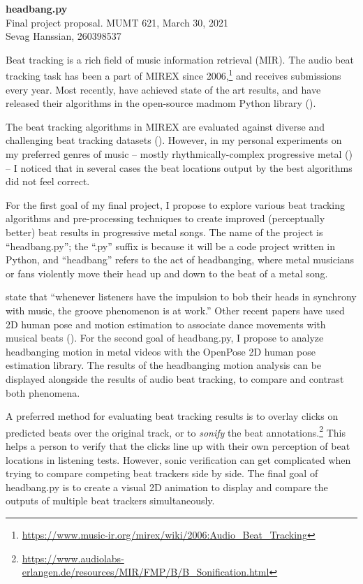 \documentclass[letter,12pt]{report}
\begin{document}
\noindent\Large{\textbf{headbang.py}}\\
\large{Final project proposal. MUMT 621, March 30, 2021}\\
\large{Sevag Hanssian, 260398537}

\noindent\hrulefill

\vspace{2em}

Beat tracking is a rich field of music information retrieval (MIR). The audio beat tracking task has been a part of MIREX since 2006,\footnote{\url{https://www.music-ir.org/mirex/wiki/2006:Audio_Beat_Tracking}} and receives submissions every year. Most recently, \textcite{bock1, bock2} have achieved state of the art results, and have released their algorithms in the open-source madmom Python library (\cite{madmom}).

The beat tracking algorithms in MIREX are evaluated against diverse and challenging beat tracking datasets (\cite{beatmeta}). However, in my personal experiments on my preferred genres of music -- mostly rhythmically-complex progressive metal (\cite{meshuggah, periphery}) -- I noticed that in several cases the beat locations output by the best algorithms did not feel correct.

For the first goal of my final project, I propose to explore various beat tracking algorithms and pre-processing techniques to create improved (perceptually better) beat results in progressive metal songs. The name of the project is ``headbang.py''; the ``.py'' suffix is because it will be a code project written in Python, and ``headbang'' refers to the act of headbanging, where metal musicians or fans violently move their head up and down to the beat of a metal song.

\textcite{groove} state that ``whenever listeners have the impulsion to bob their heads in synchrony with music, the groove phenomenon is at work.'' Other recent papers have used 2D human pose and motion estimation to associate dance movements with musical beats (\cite{pose1, pose2}). For the second goal of headbang.py, I propose to analyze headbanging motion in metal videos with the OpenPose 2D human pose estimation library. The results of the headbanging motion analysis can be displayed alongside the results of audio beat tracking, to compare and contrast both phenomena.

A preferred method for evaluating beat tracking results is to overlay clicks on predicted beats over the original track, or to \textit{sonify} the beat annotations.\footnote{\url{https://www.audiolabs-erlangen.de/resources/MIR/FMP/B/B_Sonification.html}} This helps a person to verify that the clicks line up with their own perception of beat locations in listening tests. However, sonic verification can get complicated when trying to compare competing beat trackers side by side. The final goal of headbang.py is to create a visual 2D animation to display and compare the outputs of multiple beat trackers simultaneously.

\vfill
\clearpage

\printbibheading[title={\vspace{-3.5em}References},heading=bibnumbered]
\vspace{-1.5em}
\printbibliography[heading=none]
\end{document}
